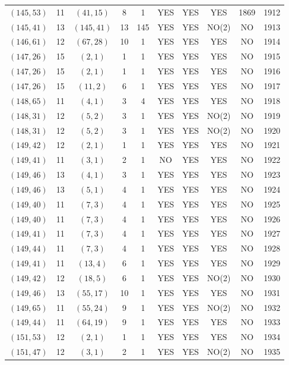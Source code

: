 \begin{longtable}{|c|c|c|c|c|c|c|c|c|c|}
$(145, 53)$ & 11 & $(41, 15)$ & 8 & 1 & YES & YES & YES & 1869 & 1912\\
$(145, 41)$ & 13 & $(145, 41)$ & 13 & 145 & YES & YES & NO(2) & NO & 1913\\
$(146, 61)$ & 12 & $(67, 28)$ & 10 & 1 & YES & YES & YES & NO & 1914\\
$(147, 26)$ & 15 & $(2, 1)$ & 1 & 1 & YES & YES & YES & NO & 1915\\
$(147, 26)$ & 15 & $(2, 1)$ & 1 & 1 & YES & YES & YES & NO & 1916\\
$(147, 26)$ & 15 & $(11, 2)$ & 6 & 1 & YES & YES & YES & NO & 1917\\
$(148, 65)$ & 11 & $(4, 1)$ & 3 & 4 & YES & YES & YES & NO & 1918\\
$(148, 31)$ & 12 & $(5, 2)$ & 3 & 1 & YES & YES & NO(2) & NO & 1919\\
$(148, 31)$ & 12 & $(5, 2)$ & 3 & 1 & YES & YES & NO(2) & NO & 1920\\
$(149, 42)$ & 12 & $(2, 1)$ & 1 & 1 & YES & YES & YES & NO & 1921\\
$(149, 41)$ & 11 & $(3, 1)$ & 2 & 1 & NO & YES & YES & NO & 1922\\
$(149, 46)$ & 13 & $(4, 1)$ & 3 & 1 & YES & YES & YES & NO & 1923\\
$(149, 46)$ & 13 & $(5, 1)$ & 4 & 1 & YES & YES & YES & NO & 1924\\
$(149, 40)$ & 11 & $(7, 3)$ & 4 & 1 & YES & YES & YES & NO & 1925\\
$(149, 40)$ & 11 & $(7, 3)$ & 4 & 1 & YES & YES & YES & NO & 1926\\
$(149, 41)$ & 11 & $(7, 3)$ & 4 & 1 & YES & YES & YES & NO & 1927\\
$(149, 44)$ & 11 & $(7, 3)$ & 4 & 1 & YES & YES & YES & NO & 1928\\
$(149, 41)$ & 11 & $(13, 4)$ & 6 & 1 & YES & YES & YES & NO & 1929\\
$(149, 42)$ & 12 & $(18, 5)$ & 6 & 1 & YES & YES & NO(2) & NO & 1930\\
$(149, 46)$ & 13 & $(55, 17)$ & 10 & 1 & YES & YES & YES & NO & 1931\\
$(149, 65)$ & 11 & $(55, 24)$ & 9 & 1 & YES & YES & NO(2) & NO & 1932\\
$(149, 44)$ & 11 & $(64, 19)$ & 9 & 1 & YES & YES & YES & NO & 1933\\
$(151, 53)$ & 12 & $(2, 1)$ & 1 & 1 & YES & YES & YES & NO & 1934\\
$(151, 47)$ & 12 & $(3, 1)$ & 2 & 1 & YES & YES & NO(2) & NO & 1935\\

\end{longtable}
